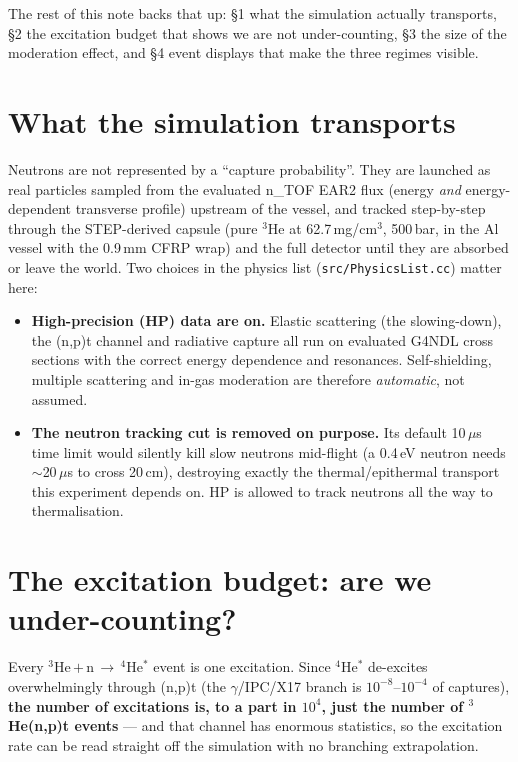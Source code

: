 \documentclass[11pt,a4paper]{article}
\newcommand{\He}[1]{$^{#1}$He}
\begin{document}
\noindent The rest of this note backs that up: \S1 what the simulation
actually transports, \S2 the excitation budget that shows we are not
under-counting, \S3 the size of the moderation effect, and \S4 event displays
that make the three regimes visible.

\section{What the simulation transports}
Neutrons are not represented by a ``capture probability''. They are launched as
real particles sampled from the evaluated n\_TOF EAR2 flux (energy \emph{and}
energy-dependent transverse profile) upstream of the vessel, and tracked
step-by-step through the STEP-derived capsule (pure \He{3} at
62.7\,mg/cm$^3$, 500\,bar, in the Al vessel with the 0.9\,mm CFRP wrap) and the
full detector until they are absorbed or leave the world. Two choices in the
physics list (\texttt{src/PhysicsList.cc}) matter here:

\begin{itemize}
  \item \textbf{High-precision (HP) data are on.} Elastic scattering (the
    slowing-down), the (n,p)t channel and radiative capture all run on
    evaluated G4NDL cross sections with the correct energy dependence and
    resonances. Self-shielding, multiple scattering and in-gas moderation are
    therefore \emph{automatic}, not assumed.
  \item \textbf{The neutron tracking cut is removed on purpose.} Its default
    10\,$\mu$s time limit would silently kill slow neutrons mid-flight (a
    0.4\,eV neutron needs $\sim$20\,$\mu$s to cross 20\,cm), destroying exactly
    the thermal/epithermal transport this experiment depends on. HP is allowed
    to track neutrons all the way to thermalisation.
\end{itemize}

\section{The excitation budget: are we under-counting?}
Every \He{3}\,$+$\,n\,$\to$\,\He{4}$^{*}$ event is one excitation. Since
\He{4}$^{*}$ de-excites overwhelmingly through (n,p)t (the $\gamma$/IPC/X17
branch is $10^{-8}$--$10^{-4}$ of captures), \textbf{the number of excitations
is, to a part in $10^{4}$, just the number of \He{3}(n,p)t events} --- and that
channel has enormous statistics, so the excitation rate can be read straight
off the simulation with no branching extrapolation.
\end{document}
